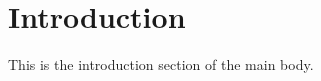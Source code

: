 



\section{Introduction} \label{introduction}

This is the introduction section of the main body.
